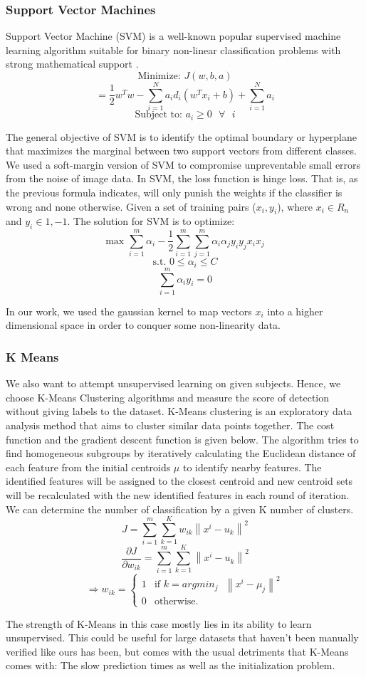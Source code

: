 \documentclass[11pt,twocolumn,letterpaper]{article}
\newcommand{\norm}[1]{\left\lVert#1\right\rVert}
\begin{document}
\subsubsection{Support Vector Machines}
Support Vector Machine (SVM) is a well-known popular supervised machine learning algorithm suitable for binary non-linear classification problems with strong mathematical support\cite{10.1145/130385.130401} \cite{10.1023/A:1022627411411}. 
$$\text{Minimize: } J(w, b, a) $$
$$= \frac{1}{2} w^T w - \sum^{N}_{i=1} a_id_i(w^Tx_i + b) + \sum^N_{i=1}a_i$$
$$\text{Subject to: } a_{i} \geq  0\text{ } \forall \text{ } i$$
\par
The general objective of SVM is to identify the optimal boundary or hyperplane that maximizes the marginal between two support vectors from different classes. We used a soft-margin version of SVM to compromise unpreventable small errors from the noise of image data. In SVM, the loss function is hinge loss. That is, as the previous formula indicates, will only punish the weights if the classifier is wrong and none otherwise. Given a set of training pairs ($x_i, y_i$), where $x_i \in R_n$ and $y_i \in {1, -1}$. The solution for SVM is to optimize:
$$\text{max } \sum^{m}_{i=1} \alpha_i - \frac{1}{2}\sum^m_{i=1}\sum^m_{j=1}\alpha_i\alpha_jy_iy_j x_ix_j $$
$$\text{s.t. } 0 \leq \alpha_i \leq C $$
$$\sum^m_{i=1}\alpha_iy_i = 0$$\par 
In our work, we used the gaussian kernel to map vectors $x_i$ into a higher dimensional space in order to conquer some non-linearity data.
\subsubsection{K Means}
We also want to attempt unsupervised learning on given subjects. Hence, we choose K-Means Clustering algorithms and measure the score of detection without giving labels to the dataset. K-Means clustering is an exploratory data analysis method that aims to cluster similar data points together. The cost function and the gradient descent function is given below. The algorithm tries to find homogeneous subgroups by iteratively calculating the Euclidean distance of each feature from the initial centroids $\mu$ to identify nearby features. The identified features will be assigned to the closest centroid and new centroid sets will be recalculated with the new identified features in each round of iteration.  We can determine the number of classification by a given K number of clusters. 
$$J = \sum^m_{i=1} \sum^K_{k=1}w_{ik}\norm{x^i - u_k}^2$$
$$\frac{\partial J}{\partial w_{ik}} = \sum^m_{i=1} \sum^K_{k=1} \norm{x^i - u_k}^2$$
\[ \Rightarrow w_{ik}= \begin{cases} 
    1 & \text{if } k = argmin_j \text{ } \norm{x^i - \mu_j}^2 \\
    0 & \text{otherwise.}
 \end{cases}
\] \par
The strength of K-Means in this case mostly lies in its ability to learn unsupervised. This could be useful for large datasets that haven't been manually verified like ours has been, but comes with the usual detriments that K-Means comes with: The slow prediction times as well as the initialization problem.
\end{document}
